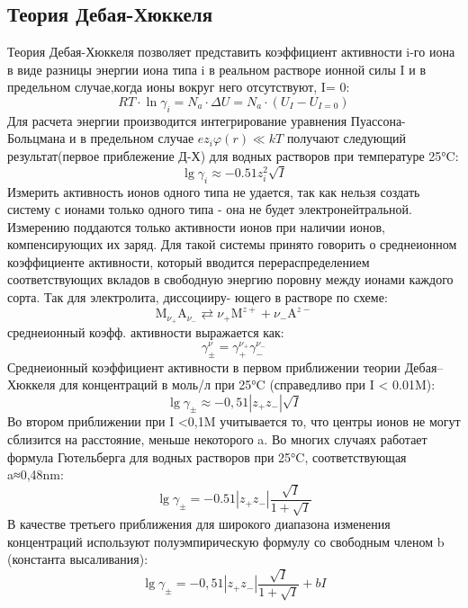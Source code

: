 \documentclass[a4paper, 12pt]{article}
\begin{document}
\subsection{Теория Дебая-Хюккеля}
Теория Дебая-Хюккеля позволяет представить коэффициент активности i-го иона в виде разницы энергии иона типа i в реальном растворе ионной силы I и в предельном случае,когда ионы вокруг него отсутствуют, I= 0:
\begin{equation}
R T \cdot \ln \gamma_{i}=N_{a} \cdot \Delta U=N_{a} \cdot\left(U_{I}-U_{I=0}\right)
\end{equation}
Для расчета энергии производится интегрирование уравнения Пуассона-Больцмана и в предельном случае $ez_{i} \varphi(r) \ll k T$ получают следующий результат(первое приблежение Д-Х) для водных растворов при температуре 25°C:
$$
\lg \gamma_{i} \approx-0.51 z_{i}^{2} \sqrt{I}
$$
Измерить активность ионов одного типа не удается, так как нельзя создать систему с ионами только одного типа - она не будет электронейтральной. Измерению
поддаются только активности ионов при наличии ионов, компенсирующих их заряд.
Для такой системы принято говорить о среднеионном коэффициенте активности, который вводится перераспределением соответствующих вкладов в свободную
энергию поровну между ионами каждого сорта. Так для электролита, диссоцииру-
ющего в растворе по схеме: 
$$
\mathrm{M}_{\nu_{+}} \mathrm{A}_{\nu_{-}} \rightleftarrows \nu_{+} \mathrm{M}^{z+}+\nu_{-} \mathrm{A}^{z-}
$$
среднеионный коэфф. активности выражается как:
\begin{equation}
\gamma_{\pm}^{\nu}=\gamma_{+}^{\nu_{+}} \gamma_{-}^{\nu_{-}}
\end{equation}
Среднеионный коэффициент активности в первом приближении теории Дебая–Хюккеля для концентраций в моль/л при 25°C (справедливо при I < 0.01M):
\begin{equation}
\lg \gamma_{\pm} \approx-0,51\left|z_{+} z_{-}\right| \sqrt{I}
\end{equation}
Во втором приближении при I <0,1M учитывается то, что центры ионов не могут сблизится на расстояние, меньше некоторого a. Во многих случаях работает формула Гютельберга для водных растворов при 25°C, соответствующая a≈0,48nm:
\begin{equation}
\lg \gamma_{\pm}=-0.51\left|z_{+} z_{-}\right| \frac{\sqrt{I}}{1+\sqrt{I}}
\end{equation}
В качестве третьего приближения для широкого диапазона изменения концентраций используют полуэмпирическую формулу со свободным членом b (константа высаливания):
\begin{equation}
\lg \gamma_{\pm}=-0,51\left|z_{+} z_{-}\right| \frac{\sqrt{I}}{1+\sqrt{I}}+b I
\end{equation}
\end{document}
